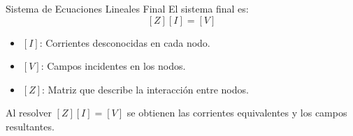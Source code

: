 \documentclass{beamer}
\begin{document}
\begin{frame}{Sistema de Ecuaciones Lineales Final}
    El sistema final es:
    $$[Z][I] = [V]$$
    \begin{itemize}
        \item $[I]$: Corrientes desconocidas en cada nodo.
        \item $[V]$: Campos incidentes en los nodos.
        \item $[Z]$: Matriz que describe la interacción entre nodos.
    \end{itemize}
    Al resolver $[Z][I] = [V]$ se obtienen las corrientes equivalentes y los campos resultantes.
\end{frame}
\end{document}
